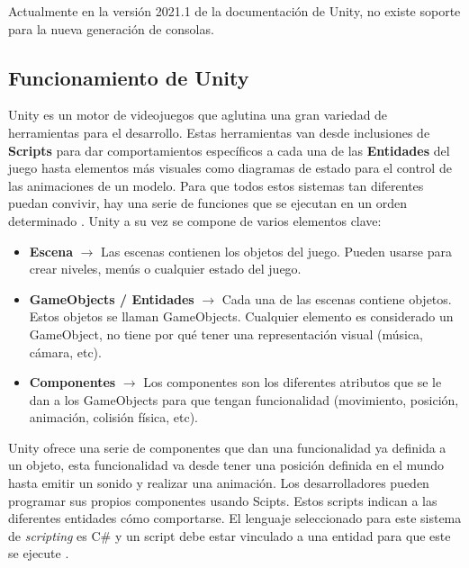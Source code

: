 Actualmente en la versi\'on 2021.1 de la documentaci\'on de Unity, no existe soporte para la nueva generaci\'on de consolas.\\


\subsection {Funcionamiento de Unity}

Unity es un motor de videojuegos que aglutina una gran variedad de herramientas para el desarrollo. Estas herramientas van desde inclusiones de \textbf{Scripts} para dar comportamientos espec\'ificos a cada una de las \textbf{Entidades} del juego hasta elementos m\'as visuales como diagramas de estado para el control de las animaciones de un modelo. Para que todos estos sistemas tan diferentes puedan convivir, hay una serie de funciones que se ejecutan en un orden determinado \citep*{bookunity}. Unity a su vez se compone de varios elementos clave:\\

\begin {itemize}
\item \textbf{Escena} $\rightarrow$  Las escenas contienen los objetos del juego. Pueden usarse para crear niveles, men\'us o cualquier estado del juego.
\item \textbf{GameObjects / Entidades} $\rightarrow$ Cada una de las escenas contiene objetos. Estos objetos se llaman GameObjects. Cualquier elemento es considerado un GameObject, no tiene por qu\'e tener una representaci\'on visual (m\'usica, c\'amara, etc).
\item \textbf{Componentes} $\rightarrow$ Los componentes son los diferentes atributos que se le dan a los GameObjects para que tengan funcionalidad (movimiento, posici\'on, animaci\'on, colisi\'on f\'isica, etc).
\end {itemize}

Unity ofrece una serie de componentes que dan una funcionalidad ya definida a un objeto, esta funcionalidad va desde tener una posici\'on definida en el mundo hasta emitir un sonido y realizar una animaci\'on. Los desarrolladores pueden programar sus propios componentes usando Scipts. Estos scripts indican a las diferentes entidades c\'omo comportarse. El lenguaje seleccionado para este sistema de \textit{scripting} es C\# y un script debe estar vinculado a una entidad para que este se ejecute \citep*{learnunity}. \\

